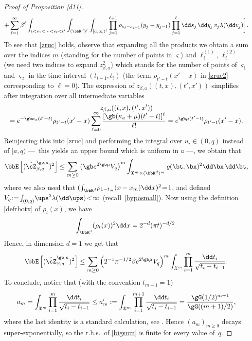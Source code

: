 \begin{proof}[Proof of Proposition \ref{d11}]
\begin{multline}
+ \sum_{\ell=1}^{\infty} \beta^{\ell} \int_{ t< s_1<\dots<s_{\ell}<t' } \int_{(\bbR^d)^{\ell}} \int_{[a,\infty)^\ell} \prod_{j=1}^{\ell+1} \rho_{s_j-s_{j-1}} (y_j-y_{j-1}) \prod_{j=1}^{\ell}
\dd s_j\, \dd y_j\, v_j \lambda(\dd v_j) \bigg].
\end{multline}
To see that \eqref{zruc} holds, observe that expanding all the products we obtain a sum over the indices $m$ (standing for the number of points in $\varsigma$) and $\ell^{(1)}_i$, $\ell^{(2)}_i$ (we need two indices to expand $z^2_{\beta,a}$) which stands for
the number of points of $\varsigma_1$ and $\varsigma_2$ in the time interval $(t_{i-1},t_{i})$
(the term $\rho_{t'-t}(x'-x)$ in \eqref{zruc2} corresponding to $\ell=0$).
The expression of $z_{\beta,a} ((t,x), (t',x'))$ simplifies after integration over all intermediate variables\vspace*{-5pt}
\begin{multline}
z_{\beta,a} ((t,x), (t',x')) \\[-5pt]
= e^{ -\gb \kappa_a (t'-t)} \rho_{t'-t}(x'-x) \sum_{\ell=0}^{\infty} \frac{[\gb (\kappa_a +\mu) (t'-t)]^{\ell}}{ \ell !}= e^{ \gb \mu (t'-t)}
\rho_{t'-t}(x'-x).
\end{multline}
Reinjecting this into \eqref{zruc} and performing the integral over $u_i\in (0,q)$ instead of $[a,q)$ ---~this yields an upper bound which is uniform in $a$ ---, we obtain that
\begin{equation}
\label{eq:secondmomentZq}
\bbE \left[ (\hat \cZ^{\go,a}_{\beta,q})^2 \right]
\le \sum_{m \ge 0} \left(\gb e^{2\gb \mu} V_q \right)^{m} \int_{ \mathfrak{X}^m \times (\bbR^d)^m}
\varrho(\bt,\bx)^2
\dd \bx\, \dd \bt,
\end{equation}
where we also used that $(\int_{\bbR^d} \!\rho_{1-t_m}(x-x_m) \dd x)^2\!=\!1$, and defined \hbox{$V_q \!:=\! \int_{(0,q)}\! \ups^2 \lambda(\dd \ups)\!<\!\infty$} (recall~\eqref{hyposmall}).
Now using the definition \eqref{defrhotx} of $\rho_t(x)$, we have
\begin{equation}\label{lekalek}
\int_{\bbR^d}(\rho_{t}(x))^2\dd x
= 2^{-d}(\pi t)^{-d/2}.
\end{equation}
Hence, in dimension $d=1$ we get that
\begin{equation}\label{bigsum}
\bbE \left[ (\hat \cZ^{\go,a}_{\beta,q})^2 \right]\le \sum_{m \ge 0} \left(2^{-1}\pi^{-1/2} \beta e^{2\gb \mu} V_q \right)^{m} \int_{\mathfrak{X}^m} \prod_{i=1}^m
\frac{ \dd t_i}{\sqrt {t_i-t_{i-1}}}.
\end{equation}
To conclude, notice that (with the convention $t_{m+1}=1$)
\[
a_m= \int_{\mathfrak{X}^m} \prod_{i=1}^m
\frac{ \dd t_i}{\sqrt {t_i-t_{i-1}}}
\leq a_m' := \int_{\mathfrak{X}^m}
\prod_{i=1}^{m+1}
\frac{ \dd t_i}{\sqrt {t_i-t_{i-1}}}
= \frac{\gG(1/2)^{m+1} }{\gG((m+1)/2)},
\]
where the last identity is a standard calculation, see \eg \cite[Lem.\,A.3]{BL20_disc}.
Hence $(a_m)_{m\geq 0}$ decays super-exponentially,
so the r.h.s.\ of \eqref{bigsum} is finite for every value of~$q$.
\end{proof}

